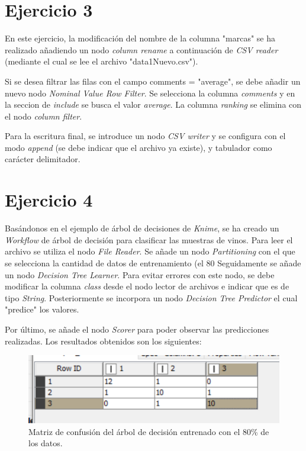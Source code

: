 \documentclass[10pt,a4paper]{article}
\begin{document}
\section{Ejercicio 3}

En este ejercicio, la modificación del nombre de la columna "marcas" se ha realizado añadiendo un nodo \textit{column rename} a continuación de \textit{CSV reader} (mediante el cual se lee el archivo "data1Nuevo.csv").  \par
Si se desea filtrar las filas con el campo comments = "average", se debe añadir un nuevo nodo \textit{Nominal Value Row Filter}. Se selecciona la columna \textit{comments} y en la seccion de \textit{include} se busca el valor \textit{average}. La columna \textit{ranking} se elimina con el nodo \textit{column filter}.  

Para la escritura final, se introduce un nodo \textit{CSV writer} y se configura con el modo \textit{append} (se debe indicar que el archivo ya existe), y tabulador como carácter delimitador.

\newpage
\section{Ejercicio 4}

Basándonos en el ejemplo de árbol de decisiones de \textit{Knime}, se ha creado un \textit{Workflow} de árbol de decisión para clasificar las muestras de vinos. 
Para leer el archivo se utiliza el nodo \textit{File Reader}. Se añade un nodo \textit{Partitioning} con el que se selecciona la cantidad de datos de entrenamiento (el 80%
Seguidamente se añade un nodo \textit{Decision Tree Learner}. Para evitar errores con este nodo, se debe modificar la columna \textit{class} desde el nodo lector de archivos e indicar que es de tipo \textit{String}. Posteriormente se incorpora un nodo \textit{Decision Tree Predictor} el cual "predice" los valores.\par
Por último, se añade el nodo \textit{Scorer} para poder observar las predicciones realizadas. Los resultados obtenidos son los siguientes:
\begin{figure}[h!]
	\centering
	\includegraphics[scale=0.7]{images/prediction.png}
	\caption{Matriz de confusión del árbol de decisión entrenado con el 80\%{} de los datos.}
	\label{fig:prediction} 
\end{figure}
\end{document}
